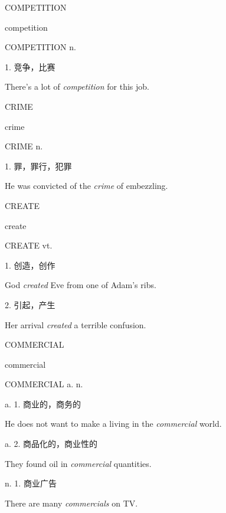 \begin{flashcard}{
COMPETITION

competition
}
\begin{center}
COMPETITION n. 
\end{center}
1. 竞争，比赛

There's a lot of \textit{competition} for this job.

\end{flashcard}
\begin{flashcard}{
CRIME

crime
}
\begin{center}
CRIME n. \textipa{[kraim]}
\end{center}
1. 罪，罪行，犯罪

He was convicted of the \textit{crime} of embezzling.

\end{flashcard}
\begin{flashcard}{
CREATE

create
}
\begin{center}
CREATE vt. 
\end{center}
1. 创造，创作

God \textit{created} Eve from one of Adam's ribs.

2. 引起，产生

Her arrival \textit{created} a terrible confusion.

\end{flashcard}
\begin{flashcard}{
COMMERCIAL

commercial
}
\begin{center}
COMMERCIAL a. n. 
\end{center}
a. 1. 商业的，商务的

He does not want to make a living in the \textit{commercial} world.

a. 2. 商品化的，商业性的

They found oil in \textit{commercial} quantities.

n. 1. 商业广告

There are many \textit{commercials} on TV.

\end{flashcard}
